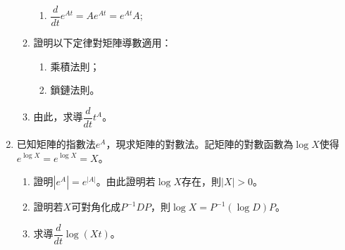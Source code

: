 \documentclass[12pt]{article}
\begin{document}
\begin{enumerate}
\begin{enumerate}
\begin{enumerate}
                \item $\dfrac{d}{dt}e^{At}=Ae^{At}=e^{At}A$;
            \end{enumerate}
            \item 證明以下定律對矩陣導數適用：\begin{enumerate}
                \item 乘積法則；
                \item 鎖鏈法則。
            \end{enumerate}
            \item 由此，求導$\dfrac{d}{dt}t^{A}$。
        \end{enumerate}
        \item 已知矩陣的指數法$e^{A}$，現求矩陣的對數法。記矩陣的對數函數為$\log{X}$使得$e^{\log{X}}=e^{\log{X}}=X$。\begin{enumerate}
            \item 證明$|e^A|=e^{|A|}$。由此證明若$\log{X}$存在，則$|X|> 0$。
            \item 證明若$X$可對角化成$P^{-1}DP$，則$\log{X}=P^{-1}(\log{D})P$。
            \item 求導$\dfrac{d}{dt}\log{(Xt)}$。
        \end{enumerate}
    \end{enumerate}
\end{document}
